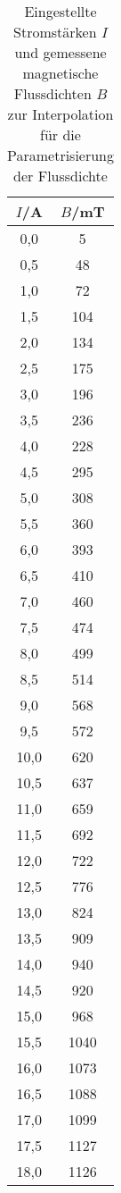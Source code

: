 \begin{table}[htp]
	\begin{center}
    \caption{Eingestellte Stromstärken $I$ und gemessene magnetische Flussdichten $B$ zur Interpolation für die Parametrisierung der Flussdichte}
    \label{tab:IB}
		\begin{tabular}{cc}
		\toprule
			{$I$/A} & {$B$/mT}\\
			\midrule
			 0,0 &    5\\
			 0,5 &   48\\
			 1,0 &   72\\
			 1,5 &  104\\
			 2,0 &  134\\
			 2,5 &  175\\
			 3,0 &  196\\
			 3,5 &  236\\
			 4,0 &  228\\
			 4,5 &  295\\
			 5,0 &  308\\
			 5,5 &  360\\
			 6,0 &  393\\
			 6,5 &  410\\
			 7,0 &  460\\
			 7,5 &  474\\
			 8,0 &  499\\
			 8,5 &  514\\
			 9,0 &  568\\
			 9,5 &  572\\
			10,0 &  620\\
			10,5 &  637\\
			11,0 &  659\\
			11,5 &  692\\
			12,0 &  722\\
			12,5 &  776\\
			13,0 &  824\\
			13,5 &  909\\
			14,0 &  940\\
			14,5 &  920\\
			15,0 &  968\\
			15,5 & 1040\\
			16,0 & 1073\\
			16,5 & 1088\\
			17,0 & 1099\\
			17,5 & 1127\\
			18,0 & 1126\\
		\bottomrule
		\end{tabular}
	\end{center}
\end{table}

